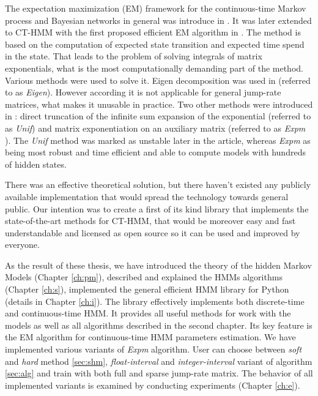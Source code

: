 \documentclass[thesis=M,english]{FITthesis}[2012/10/20]
\begin{document}
\begin{introduction}
The expectation maximization (EM) framework for the continuous-time Markov process and Bayesian networks in general was introduce in \cite{No12}. It was later extended to CT-HMM with the first proposed efficient EM algorithm in \cite{Li15}. The method is based on the computation of expected state transition and expected time spend in the state. That leads to the problem of solving integrals of matrix exponentials, what is the most computationally demanding part of the method. Various methods were used to solve it. Eigen decomposition was used in \cite{Wa14} (referred to as \textit{Eigen}). However according \cite{Li15} it is not applicable for general jump-rate matrices, what makes it unusable in practice. Two other methods were introduced in \cite{Li15}: direct truncation of the infinite sum expansion of the exponential (referred to as \textit{Unif}) and matrix exponentiation on an auxiliary matrix (referred to as \textit{Expm} ). The \textit{Unif} method was marked as unstable later in the article, whereas \textit{Expm} as being most robust and time efficient and able to compute models with hundreds of hidden states.      

There was an effective theoretical solution, but there haven't existed any publicly available implementation that would spread the technology towards general public. Our intention was to create a first of its kind library that implements the state-of-the-art methods for CT-HMM, that would be moreover easy and fast understandable and licensed as open source so it can be used and improved by everyone. 

As the result of these thesis, we have introduced the theory of the hidden Markov Models (Chapter  \ref{ch:pm}), described and explained the HMMs algorithms (Chapter \ref{ch:s}), implemented the general efficient HMM library for Python (details in Chapter \ref{ch:i}). The library effectively implements both discrete-time and continuous-time HMM. It provides all useful methods for work with the models as well as all algorithms described in the second chapter. Its key feature is the EM algorithm for continuous-time HMM parameters estimation. We have implemented various variants of \textit{Expm} algorithm. User can choose between \textit{soft} and \textit{hard} method \ref{sec:shm}, \textit{float-interval} and \textit{integer-interval} variant of algorithm \ref{sec:alg} and train with both full and sparse jump-rate matrix. The behavior of all implemented variants is examined by conducting  experiments (Chapter \ref{ch:e}).      
 	
\end{introduction}
\end{document}
